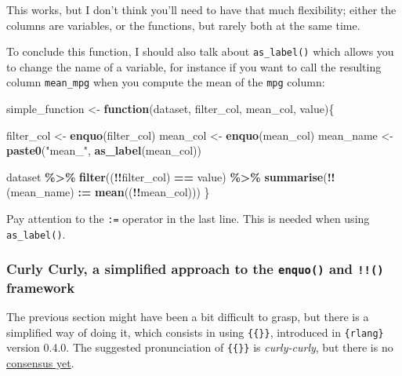 \documentclass[
]{article}
\newenvironment{Shaded}{\begin{snugshade}}{\end{snugshade}}
\newcommand{\ControlFlowTok}[1]{\textcolor[rgb]{0.13,0.29,0.53}{\textbf{#1}}}
\newcommand{\ErrorTok}[1]{\textcolor[rgb]{0.64,0.00,0.00}{\textbf{#1}}}
\newcommand{\KeywordTok}[1]{\textcolor[rgb]{0.13,0.29,0.53}{\textbf{#1}}}
\newcommand{\NormalTok}[1]{#1}
\newcommand{\OperatorTok}[1]{\textcolor[rgb]{0.81,0.36,0.00}{\textbf{#1}}}
\newcommand{\StringTok}[1]{\textcolor[rgb]{0.31,0.60,0.02}{#1}}
\begin{document}
This works, but I don't think you'll need to have that much flexibility; either the columns
are variables, or the functions, but rarely both at the same time.

To conclude this function, I should also talk about \texttt{as\_label()} which allows you to change the
name of a variable, for instance if you want to call the resulting column \texttt{mean\_mpg} when you
compute the mean of the \texttt{mpg} column:

\begin{Shaded}
\begin{Highlighting}[]
\NormalTok{simple\_function \textless{}{-}}\StringTok{ }\ControlFlowTok{function}\NormalTok{(dataset, filter\_col, mean\_col, value)\{}

\NormalTok{  filter\_col \textless{}{-}}\StringTok{ }\KeywordTok{enquo}\NormalTok{(filter\_col)}
\NormalTok{  mean\_col \textless{}{-}}\StringTok{ }\KeywordTok{enquo}\NormalTok{(mean\_col)}
\NormalTok{  mean\_name \textless{}{-}}\StringTok{ }\KeywordTok{paste0}\NormalTok{(}\StringTok{"mean\_"}\NormalTok{, }\KeywordTok{as\_label}\NormalTok{(mean\_col))}
  
\NormalTok{  dataset }\OperatorTok{\%\textgreater{}\%}
\StringTok{    }\KeywordTok{filter}\NormalTok{((}\OperatorTok{!!}\NormalTok{filter\_col) }\OperatorTok{==}\StringTok{ }\NormalTok{value) }\OperatorTok{\%\textgreater{}\%}
\StringTok{    }\KeywordTok{summarise}\NormalTok{(}\OperatorTok{!!}\NormalTok{(mean\_name) }\OperatorTok{:}\ErrorTok{=}\StringTok{ }\KeywordTok{mean}\NormalTok{((}\OperatorTok{!!}\NormalTok{mean\_col)))}
\NormalTok{\}}
\end{Highlighting}
\end{Shaded}

Pay attention to the \texttt{:=} operator in the last line. This is needed when using \texttt{as\_label()}.

\hypertarget{curly-curly-a-simplified-approach-to-the-enquo-and-framework}{%
\subsubsection{\texorpdfstring{Curly Curly, a simplified approach to the \texttt{enquo()} and \texttt{!!()} framework}{Curly Curly, a simplified approach to the enquo() and !!() framework}}\label{curly-curly-a-simplified-approach-to-the-enquo-and-framework}}

The previous section might have been a bit difficult to grasp, but there is a simplified way of doing it,
which consists in using \texttt{\{\{\}\}}, introduced in \texttt{\{rlang\}} version 0.4.0.
The suggested pronunciation of \texttt{\{\{\}\}} is \emph{curly-curly}, but there is no
\href{https://twitter.com/JonTheGeek/status/1144815369766547456}{consensus yet}.
\end{document}
